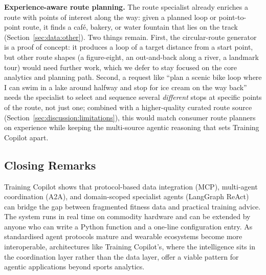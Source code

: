 \textbf{Experience-aware route planning.} The route specialist already enriches a route with points of interest along the way: given a planned loop or point-to-point route, it finds a caf\'e, bakery, or water fountain that lies on the track (Section~\ref{sec:data:other}). Two things remain. First, the circular-route generator is a proof of concept: it produces a loop of a target distance from a start point, but other route shapes (a figure-eight, an out-and-back along a river, a landmark tour) would need further work, which we defer to stay focused on the core analytics and planning path. Second, a request like ``plan a scenic bike loop where I can swim in a lake around halfway and stop for ice cream on the way back'' needs the specialist to select and sequence several \textit{different} stops at specific points of the route, not just one; combined with a higher-quality curated route source (Section~\ref{sec:discussion:limitations}), this would match consumer route planners on experience while keeping the multi-source agentic reasoning that sets Training Copilot apart.

\subsection{Closing Remarks}\label{sec:conclusion:closing}

Training Copilot shows that protocol-based data integration (MCP), multi-agent coordination (A2A), and domain-scoped specialist agents (LangGraph ReAct) can bridge the gap between fragmented fitness data and practical training advice. The system runs in real time on commodity hardware and can be extended by anyone who can write a Python function and a one-line configuration entry. As standardised agent protocols mature and wearable ecosystems become more interoperable, architectures like Training Copilot's, where the intelligence sits in the coordination layer rather than the data layer, offer a viable pattern for agentic applications beyond sports analytics.
